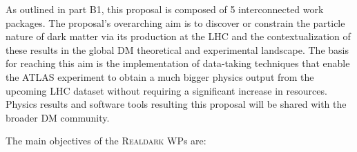 As outlined in part B1, this proposal is composed of 5 interconnected work packages. 
The proposal’s overarching aim is to discover or constrain the particle nature of dark matter via its production at the LHC and the contextualization of these results in the global DM theoretical and experimental landscape. 
The basis for reaching this aim is the implementation of data-taking techniques that enable the ATLAS experiment to obtain a much bigger physics output from the upcoming LHC dataset without requiring a significant increase in resources. 
Physics results and software tools resulting this proposal will be shared with the broader DM community. 

The main objectives of the \textsc{Realdark} WPs are: 

\begin{description}



\end{description}
